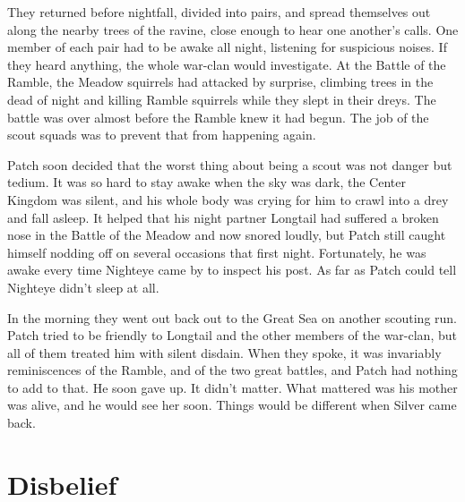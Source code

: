 \documentclass[12pt]{book}
\begin{document}
 They returned before nightfall, divided into pairs, and spread themselves out along the nearby trees of the ravine, close enough to hear one another's calls. One member of each pair had to be awake all night, listening for suspicious noises. If they heard anything, the whole war-clan would investigate. At the Battle of the Ramble, the Meadow squirrels had attacked by surprise, climbing trees in the dead of night and killing Ramble squirrels while they slept in their dreys. The battle was over almost before the Ramble knew it had begun. The job of the scout squads was to prevent that from happening again.\par
 Patch soon decided that the worst thing about being a scout was not danger but tedium. It was so hard to stay awake when the sky was dark, the Center Kingdom was silent, and his whole body was crying for him to crawl into a drey and fall asleep. It helped that his night partner Longtail had suffered a broken nose in the Battle of the Meadow and now snored loudly, but Patch still caught himself nodding off on several occasions that first night. Fortunately, he was awake every time Nighteye came by to inspect his post. As far as Patch could tell Nighteye didn't sleep at all.\par
 In the morning they went out back out to the Great Sea on another scouting run. Patch tried to be friendly to Longtail and the other members of the war-clan, but all of them treated him with silent disdain. When they spoke, it was invariably reminiscences of the Ramble, and of the two great battles, and Patch had nothing to add to that. He soon gave up. It didn't matter. What mattered was his mother was alive, and he would see her soon. Things would be different when Silver came back.\par

\section{Disbelief}
\end{document}
